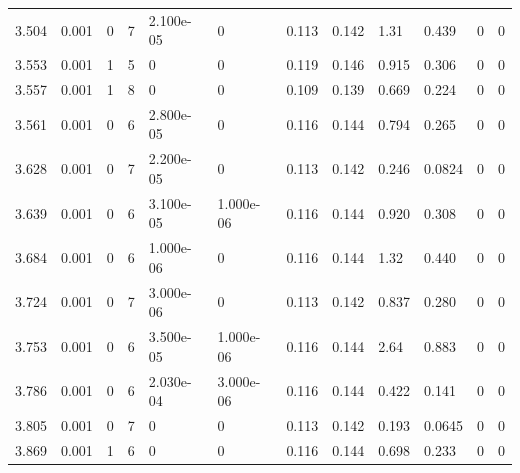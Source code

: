 \documentclass[preview]{standalone}
\begin{document}
{{{\begin{tabular}{L{1.2cm}C{1.2cm} C{0.3cm}C{0.5cm} C{1.4cm}C{1.4cm} C{1.4cm}C{1.4cm} C{1.6cm}C{1.6cm} C{1.6cm}C{1.6cm}}
  3.504  &  0.001  & 0     &  7 &  2.100e-05  & 0  &  0.113&   0.142& 1.31 & 0.439   &  0 & 0  \\ 
  3.553  &  0.001  & 1     &  5 &  0  & 0  &  0.119&   0.146& 0.915 & 0.306   &  0 & 0  \\ 
  3.557  &  0.001  & 1     &  8 &  0  & 0  &  0.109&   0.139& 0.669 & 0.224   &  0 & 0  \\ 
  3.561  &  0.001  & 0     &  6 &  2.800e-05  & 0  &  0.116&   0.144& 0.794 & 0.265   &  0 & 0  \\ 
  3.628  &  0.001  & 0     &  7 &  2.200e-05  & 0  &  0.113&   0.142& 0.246 & 0.0824   &  0 & 0  \\ 
  3.639  &  0.001  & 0     &  6 &  3.100e-05  & 1.000e-06  &  0.116&   0.144& 0.920 & 0.308   &  0 & 0  \\ 
  3.684  &  0.001  & 0     &  6 &  1.000e-06  & 0  &  0.116&   0.144& 1.32 & 0.440   &  0 & 0  \\ 
  3.724  &  0.001  & 0     &  7 &  3.000e-06  & 0  &  0.113&   0.142& 0.837 & 0.280   &  0 & 0  \\ 
  3.753  &  0.001  & 0     &  6 &  3.500e-05  & 1.000e-06  &  0.116&   0.144& 2.64 & 0.883   &  0 & 0  \\ 
  3.786  &  0.001  & 0     &  6 &  2.030e-04  & 3.000e-06  &  0.116&   0.144& 0.422 & 0.141   &  0 & 0  \\ 
  3.805  &  0.001  & 0     &  7 &  0  & 0  &  0.113&   0.142& 0.193 & 0.0645   &  0 & 0  \\ 
  3.869  &  0.001  & 1     &  6 &  0  & 0  &  0.116&   0.144& 0.698 & 0.233   &  0 & 0  \\ 
\hline 
\end{tabular} 

}}}
\end{document}

